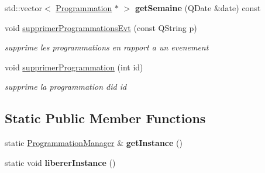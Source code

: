 \begin{DoxyCompactItemize}
\item 
\hypertarget{class_programmation_manager_a3305db243c119907a10646d504c99484}{}std\+::vector$<$ \hyperlink{class_programmation}{Programmation} $\ast$ $>$ {\bfseries get\+Semaine} (Q\+Date \&date) const \label{class_programmation_manager_a3305db243c119907a10646d504c99484}

\item 
void \hyperlink{class_programmation_manager_af1a24f310ba7b622d4e2641af7c069cf}{supprimer\+Programmations\+Evt} (const Q\+String p)
\begin{DoxyCompactList}\small\item\em supprime les programmations en rapport a un evenement \end{DoxyCompactList}\item 
void \hyperlink{class_programmation_manager_aa0dea8a1860f1fca3a462ea77ca1dc09}{supprimer\+Programmation} (int id)
\begin{DoxyCompactList}\small\item\em supprime la programmation d\textquotesingle{}id id \end{DoxyCompactList}\end{DoxyCompactItemize}
\subsection*{Static Public Member Functions}
\begin{DoxyCompactItemize}
\item 
\hypertarget{class_programmation_manager_a9da2fc647972756d1f8cdf91d4017c25}{}static \hyperlink{class_programmation_manager}{Programmation\+Manager} \& {\bfseries get\+Instance} ()\label{class_programmation_manager_a9da2fc647972756d1f8cdf91d4017c25}

\item 
\hypertarget{class_programmation_manager_a94e3fcb28ea7c632dc6750c33949d712}{}static void {\bfseries liberer\+Instance} ()\label{class_programmation_manager_a94e3fcb28ea7c632dc6750c33949d712}

\end{DoxyCompactItemize}
